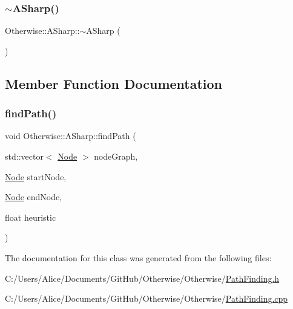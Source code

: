 \subsubsection{\texorpdfstring{$\sim$\+A\+Sharp()}{~ASharp()}}
{\footnotesize\ttfamily Otherwise\+::\+A\+Sharp\+::$\sim$\+A\+Sharp (\begin{DoxyParamCaption}{ }\end{DoxyParamCaption})}



\subsection{Member Function Documentation}
\mbox{\label{class_otherwise_1_1_a_sharp_aee3db2f71a9eb6f28f694cdde40fe437}} 
\subsubsection{\texorpdfstring{find\+Path()}{findPath()}}
{\footnotesize\ttfamily void Otherwise\+::\+A\+Sharp\+::find\+Path (\begin{DoxyParamCaption}\item[{std\+::vector$<$ \hyperlink{struct_otherwise_1_1_node}{Node} $>$}]{node\+Graph,  }\item[{\hyperlink{struct_otherwise_1_1_node}{Node}}]{start\+Node,  }\item[{\hyperlink{struct_otherwise_1_1_node}{Node}}]{end\+Node,  }\item[{float}]{heuristic }\end{DoxyParamCaption})}



The documentation for this class was generated from the following files\+:\begin{DoxyCompactItemize}
\item 
C\+:/\+Users/\+Alice/\+Documents/\+Git\+Hub/\+Otherwise/\+Otherwise/\hyperlink{_path_finding_8h}{Path\+Finding.\+h}\item 
C\+:/\+Users/\+Alice/\+Documents/\+Git\+Hub/\+Otherwise/\+Otherwise/\hyperlink{_path_finding_8cpp}{Path\+Finding.\+cpp}\end{DoxyCompactItemize}
